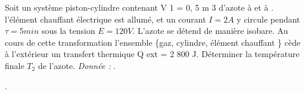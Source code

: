 \begin{Exercise}[title=Chauffage d'un gaz à l'aide une résistance]
		Soit un système piston-cylindre contenant V 1 = 0, 5 m 3 d’azote	à  et à .
		l'élément chauffant électrique est allumé, et un courant $I = 2A$	y circule pendant $\tau = 5 min$ sous la tension $E = 120 V$.
		L’azote se détend de manière isobare. Au cours de cette transformation l’ensemble \{gaz, cylindre, élément chauffant \} cède à l’extérieur un transfert thermique Q ext = 2 800 J.
		Déterminer la température finale $T_2$ de l’azote.
		\emph{Donnée : }.
\end{Exercise}
\begin{Answer}
		.
\end{Answer}
